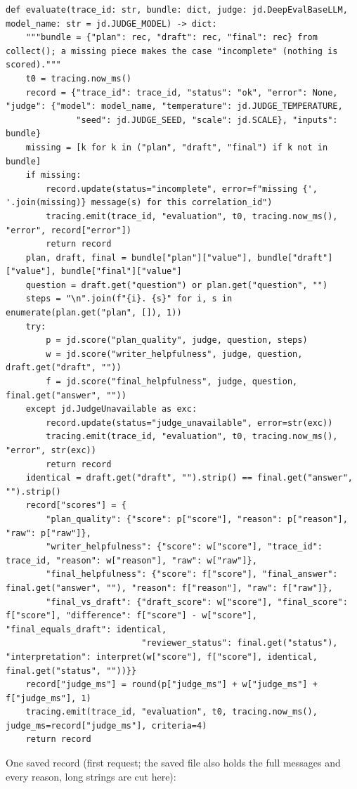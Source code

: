 \documentclass[11pt]{article}
\begin{document}
\begingroup\lstset{basicstyle=\ttfamily\tiny}
\begin{lstlisting}
def evaluate(trace_id: str, bundle: dict, judge: jd.DeepEvalBaseLLM, model_name: str = jd.JUDGE_MODEL) -> dict:
    """bundle = {"plan": rec, "draft": rec, "final": rec} from collect(); a missing piece makes the case "incomplete" (nothing is scored)."""
    t0 = tracing.now_ms()
    record = {"trace_id": trace_id, "status": "ok", "error": None, "judge": {"model": model_name, "temperature": jd.JUDGE_TEMPERATURE,
              "seed": jd.JUDGE_SEED, "scale": jd.SCALE}, "inputs": bundle}
    missing = [k for k in ("plan", "draft", "final") if k not in bundle]
    if missing:
        record.update(status="incomplete", error=f"missing {', '.join(missing)} message(s) for this correlation_id")
        tracing.emit(trace_id, "evaluation", t0, tracing.now_ms(), "error", record["error"])
        return record
    plan, draft, final = bundle["plan"]["value"], bundle["draft"]["value"], bundle["final"]["value"]
    question = draft.get("question") or plan.get("question", "")
    steps = "\n".join(f"{i}. {s}" for i, s in enumerate(plan.get("plan", []), 1))
    try:
        p = jd.score("plan_quality", judge, question, steps)
        w = jd.score("writer_helpfulness", judge, question, draft.get("draft", ""))
        f = jd.score("final_helpfulness", judge, question, final.get("answer", ""))
    except jd.JudgeUnavailable as exc:
        record.update(status="judge_unavailable", error=str(exc))
        tracing.emit(trace_id, "evaluation", t0, tracing.now_ms(), "error", str(exc))
        return record
    identical = draft.get("draft", "").strip() == final.get("answer", "").strip()
    record["scores"] = {
        "plan_quality": {"score": p["score"], "reason": p["reason"], "raw": p["raw"]},
        "writer_helpfulness": {"score": w["score"], "trace_id": trace_id, "reason": w["reason"], "raw": w["raw"]},
        "final_helpfulness": {"score": f["score"], "final_answer": final.get("answer", ""), "reason": f["reason"], "raw": f["raw"]},
        "final_vs_draft": {"draft_score": w["score"], "final_score": f["score"], "difference": f["score"] - w["score"], "final_equals_draft": identical,
                           "reviewer_status": final.get("status"), "interpretation": interpret(w["score"], f["score"], identical, final.get("status", ""))}}
    record["judge_ms"] = round(p["judge_ms"] + w["judge_ms"] + f["judge_ms"], 1)
    tracing.emit(trace_id, "evaluation", t0, tracing.now_ms(), judge_ms=record["judge_ms"], criteria=4)
    return record
\end{lstlisting}
\endgroup
One saved record (first request; the saved file also holds the full messages and every reason, long strings are cut here):
\end{document}
